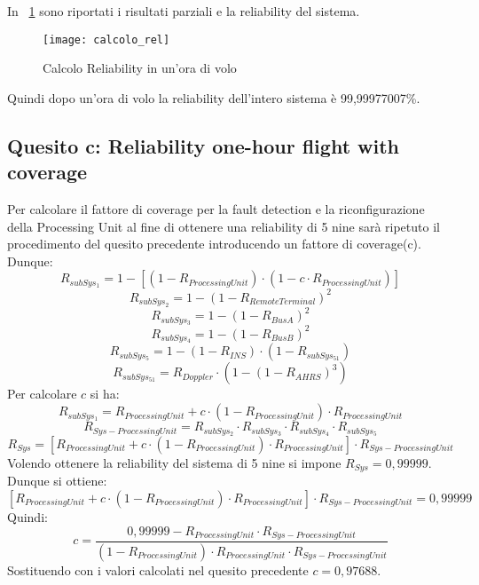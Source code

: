 \clearpage

In \figurename~\ref{calcolo_rel} sono riportati i risultati parziali e la
reliability del sistema.\\

\begin{figure}[!htbp]
  \centering
  \texttt{[image: calcolo\_rel]}
  \caption{Calcolo Reliability in un'ora di volo}
  \label{calcolo_rel}
\end{figure}

Quindi dopo un'ora di volo la reliability dell'intero sistema è 99,99977007\%.\\

\clearpage

\subsection{Quesito c: Reliability one-hour flight with coverage}

Per calcolare il fattore di coverage per la fault detection e la riconfigurazione
della Processing Unit al fine di ottenere una reliability di 5 nine sarà ripetuto
il procedimento del quesito precedente introducendo un fattore di coverage(c).\\
Dunque:
$$R_{subSys_1} = 1 -[ (1 - R_{ProcessingUnit}) \cdot (1-c\cdot R_{ProcessingUnit})]$$
$$R_{subSys_2} = 1 - (1 - R_{RemoteTerminal})^2$$
$$R_{subSys_3} = 1 - (1 - R_{BusA})^2$$
$$R_{subSys_4} = 1 - (1 - R_{BusB})^2$$
$$R_{subSys_5} = 1 - (1 - R_{INS}) \cdot (1 - R_{subSys_51})$$
$$R_{subSys_51} = R_{Doppler} \cdot (1 - (1 - R_{AHRS})^3)$$
Per calcolare $c$ si ha:
$$R_{subSys_1} = R_{ProcessingUnit}+c\cdot(1-R_{ProcessingUnit} )\cdot R_{ProcessingUnit}$$
$$R_{Sys-ProcessingUnit} =  R_{subSys_2} \cdot R_{subSys_3} \cdot R_{subSys_4} \cdot R_{subSys_5}$$
$$R_{Sys}=[R_{ProcessingUnit}+c\cdot(1-R_{ProcessingUnit})\cdot R_{ProcessingUnit}]\cdot R_{Sys-ProcessingUnit}$$
Volendo ottenere la reliability del sistema di 5 nine si impone $R_{Sys}=0,99999$.\\
Dunque si ottiene:
$$[R_{ProcessingUnit}+c\cdot(1-R_{ProcessingUnit})\cdot R_{ProcessingUnit}]\cdot R_{Sys-ProcessingUnit}=0,99999$$
Quindi:
$$ c = \frac{0,99999-R_{ProcessingUnit}\cdot R_{Sys-ProcessingUnit}}{(1-R_{ProcessingUnit})\cdot R_{ProcessingUnit} \cdot R_{Sys-ProcessingUnit}}$$
Sostituendo con i valori calcolati nel quesito precedente $c=0,97688$.\\
